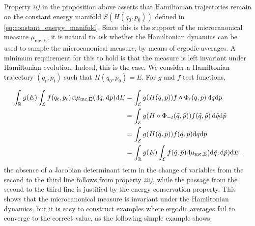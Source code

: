     Property \textit{ii)} in the proposition above asserts that Hamiltonian trajectories remain on the constant energy manifold $S(H(q_0,p_0))$ defined in \eqref{eq:constant_energy_manifold}.
    Since this is the support of the microcanonical measure $\mu_{\mathrm{mc,E}}$, it is natural to ask whether the Hamiltonian dynamics can be used to sample the microcanonical measure, by means of ergodic averages.
    A minimum requirement for this to hold is that the measure is left invariant under Hamiltonian evolution. Indeed, this is the case. We consider a Hamiltonian trajectory $(q_t,p_t)$ such that $H(q_0,p_0)=E$. For $g$ and $f$ test functions,

    \begin{align*}
        \int_{\mathbb{R}} g(E)\int_{\mathcal E}f(q_t,p_t)\,\mathrm{d}\mu_{\mathrm{mc,E}}(\mathrm{d}q,\mathrm{d}p)\mathrm{d}E&=\int_{\mathcal E} g(H(q,p))f\circ \Phi_t (q,p)\,\mathrm{d}q\mathrm{d}p\\
        &=\int_{\mathcal E} g(H\circ \Phi_{-t}(\tilde q,\tilde p))f (\tilde q,\tilde p)\,\mathrm{d}\tilde q\mathrm{d}\tilde p\\
        &=\int_{\mathcal E} g(H(\tilde q,\tilde p))f(\tilde q,\tilde p)\mathrm{d}\tilde q\mathrm{d}\tilde p\\
        &=\int_{\mathbb{R}}g(E)\int_{\mathcal E}f(\tilde q,\tilde p)\mathrm{d}\mu_{\mathrm{mc,E}}(\mathrm{d}\tilde q,\mathrm{d}\tilde p)\mathrm{d}E.
    \end{align*}
    the absence of a Jacobian determinant term in the change of variables from the second to the third line follows from property \textit{iii)}, while the passage from the second to the third line is justified by the energy conservation property.
    This shows that the microcanonical measure is invariant under the Hamiltonian dynamics, but it is easy to construct examples where ergodic averages fail to converge to the correct value, as the following simple example shows.

